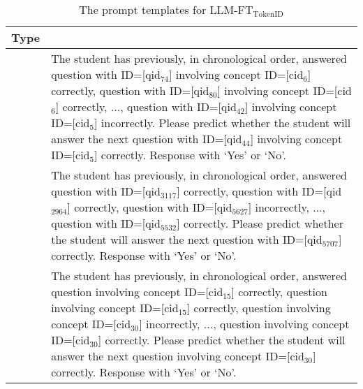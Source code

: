 \begin{table*}[hbt!]
\centering
\small
\begin{tabular}{| >{\centering\arraybackslash}m{} | >{\raggedright\arraybackslash}m{} |}
\hline
\rowcolor{lightgray} %
\textbf{Type} & \multicolumn{1}{c|}{\textbf{Template}} \\
\hline
1 & The student has previously, in chronological order, answered question with ID=[qid$_{74}$] involving concept ID=[cid$_{6}$] correctly, question with ID=[qid$_{80}$] involving concept ID=[cid$_{6}$] correctly, ..., question with ID=[qid$_{42}$] involving concept ID=[cid$_{5}$] incorrectly. Please predict whether the student will answer the next question with ID=[qid$_{44}$] involving concept ID=[cid$_{5}$] correctly. Response with `Yes' or `No'. \\
\hline
2 & The student has previously, in chronological order, answered question with ID=[qid$_{3117}$] correctly, question with ID=[qid$_{2964}$] correctly, question with ID=[qid$_{5627}$] incorrectly, ..., question with ID=[qid$_{5532}$] correctly. Please predict whether the student will answer the next question with ID=[qid$_{5707}$] correctly. Response with `Yes' or `No'. \\
\hline
3 & The student has previously, in chronological order, answered question involving concept ID=[cid$_{15}$] correctly, question involving concept ID=[cid$_{15}$] correctly, question involving concept ID=[cid$_{30}$] incorrectly, ..., question involving concept ID=[cid$_{30}$] correctly. Please predict whether the student will answer the next question involving concept ID=[cid$_{30}$] correctly. Response with `Yes' or `No'. \\
\hline
\end{tabular}
\caption{The prompt templates for LLM-FT$_\mathrm{TokenID}$}
\label{table:llm-kt-tokenid-templates}
\end{table*}

